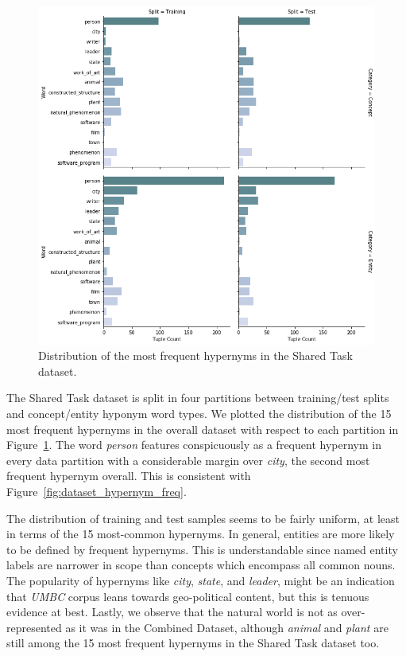 \begin{figure}[ht!] 
  \centering
  \includegraphics[width=0.85\linewidth]{images/shared_task_MFH.png}
  \caption{Distribution of the most frequent hypernyms in the Shared Task dataset.}
  \label{fig:shared_task_mfh}
\end{figure}
The Shared Task dataset is split in four partitions between training/test splits and concept/entity hyponym word types.  We plotted the distribution of the 15 most frequent hypernyms in the overall dataset with respect to each partition in Figure~\ref{fig:shared_task_mfh}.  The word \textit{person} features conspicuously as a frequent hypernym in every data partition with a considerable margin over \textit{city}, the second most frequent hypernym overall.  This is consistent with Figure~\ref{fig:dataset_hypernym_freq}.

The distribution of training and test samples seems to be fairly uniform, at least in terms of the 15 most-common hypernyms.  In general, entities are more likely to be defined by frequent hypernyms.  This is understandable since named entity labels are narrower in scope than concepts which encompass all common nouns.  The popularity of hypernyms like \textit{city}, \textit{state}, and \textit{leader}, might be an  indication that \textit{UMBC} corpus leans towards geo-political content, but this is tenuous evidence at best.  Lastly, we observe that the natural world is not as over-represented as it was in the Combined Dataset, although \textit{animal} and \textit{plant} are still among the 15 most frequent hypernyms in the Shared Task dataset too.

